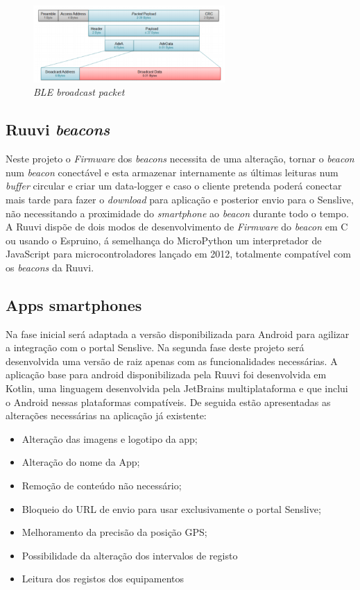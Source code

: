 \begin{figure}[htb]
\centering
\includegraphics[width=0.65\textwidth]{images/blepacket.png}
\caption{\textit{BLE broadcast packet}\cite{blepacket}}\label{blepacket}
\end{figure}


\subsection{Ruuvi \textit{beacons}}
\par Neste projeto o \textit{Firmware} dos  \textit{beacons} necessita de uma alteração, tornar o  \textit{beacon} num \textit{beacon} conectável e esta armazenar internamente as últimas leituras num \textit{buffer} circular e criar um data-logger e caso o cliente pretenda poderá conectar mais tarde para fazer o \textit{download} para aplicação e posterior envio para o Senslive, não necessitando a proximidade do \textit{smartphone} ao \textit{beacon} durante todo o tempo. A Ruuvi dispõe de dois modos de desenvolvimento de \textit{Firmware} do \textit{beacon} em C ou usando o Espruino, á semelhança do MicroPython um interpretador de JavaScript para microcontroladores lançado em 2012, totalmente compatível com os \textit{beacons} da Ruuvi.

\subsection{Apps smartphones}
Na fase inicial será adaptada a versão disponibilizada para Android para agilizar a integração com o portal Senslive. Na segunda fase deste projeto será desenvolvida uma versão de raiz apenas com as funcionalidades necessárias. A aplicação base para android disponibilizada pela Ruuvi foi desenvolvida em Kotlin\cite{ruuviappgithub}, uma linguagem desenvolvida pela JetBrains multiplataforma e que inclui o Android nessas plataformas compatíveis.
De seguida estão apresentadas as alterações necessárias na aplicação já existente:
\begin{itemize}
\item Alteração das imagens e logotipo da app;
\item Alteração do nome da App;
\item Remoção de conteúdo não necessário;
\item Bloqueio do URL de envio para usar exclusivamente o portal Senslive;
\item Melhoramento da precisão da posição GPS;
\item Possibilidade da alteração dos intervalos de registo
\item Leitura dos registos dos equipamentos
\end{itemize}



